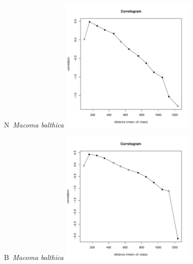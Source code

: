 \documentclass[12pt, a4paper]{disser}
\begin{document}
	
	\begin{figure}[h]

	\begin{minipage}[b]{.46\linewidth}
	\begin{center}
	{\small N~{\it Macoma balthica}}
		\includegraphics[width=65mm]{../Barenc_Sea/distribution_Moran/Pala_moran_N_Macoma_balthica_.pdf}
	\end{center}
	\end{minipage}
%
	\hfil %
%
	\begin{minipage}[b]{.46\linewidth}
	\begin{center}
	{\small B~{\it Macoma balthica}}
		\includegraphics[width=65mm]{../Barenc_Sea/distribution_Moran/Pala_moran_B_Macoma_balthica_.pdf}
	\end{center}
	\end{minipage}


\end{figure}
\end{document}
